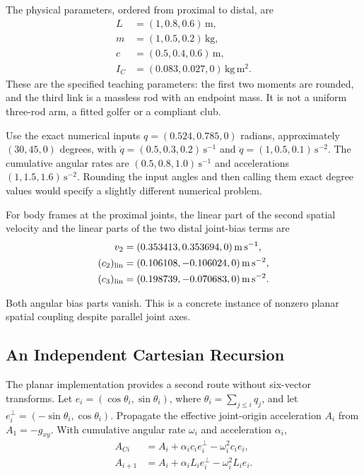 The physical parameters, ordered from proximal to distal, are
\begin{equation}
 \begin{aligned}
 L&=(1,0.8,0.6)\,\mathrm m,\\
 m&=(1,0.5,0.2)\,\mathrm{kg},\\
 c&=(0.5,0.4,0.6)\,\mathrm m,\\
 I_C&=(0.083,0.027,0)\,\mathrm{kg\,m^2}.
 \end{aligned}
 \label{eq:rnea_planar_parameters}
\end{equation}
 These are the specified teaching parameters: the first two moments are rounded, and the third link is a massless rod with an endpoint mass. It is not a uniform three-rod arm, a fitted golfer or a compliant club.

Use the exact numerical inputs $q=(0.524,0.785,0)$ radians, approximately $(30,45,0)$ degrees, with $\dot q=(0.5,0.3,0.2)\,\mathrm{s^{-1}}$ and $\ddot q=(1,0.5,0.1)\,\mathrm{s^{-2}}$. The cumulative angular rates are $(0.5,0.8,1.0)\,\mathrm{s^{-1}}$ and accelerations $(1,1.5,1.6)\,\mathrm{s^{-2}}$. Rounding the input angles and then calling them exact degree values would specify a slightly different numerical problem.

For body frames at the proximal joints, the linear part of the second spatial velocity and the linear parts of the two distal joint-bias terms are
\begin{equation}
 \begin{aligned}
 v_2&=(0.353413,0.353694,0)\,\mathrm{m\,s^{-1}},\\
 (c_2)_{\rm lin}&=(0.106108,-0.106024,0)\,\mathrm{m\,s^{-2}},\\
 (c_3)_{\rm lin}&=(0.198739,-0.070683,0)\,\mathrm{m\,s^{-2}}.
 \end{aligned}
 \label{eq:rnea_distal_bias_values}
\end{equation}

Both angular bias parts vanish. This is a concrete instance of nonzero planar spatial coupling despite parallel joint axes.

\subsection{An Independent Cartesian Recursion}

The planar implementation provides a second route without six-vector transforms. Let $e_i=(\cos\theta_i,\sin\theta_i)$, where $\theta_i=\sum_{j\leq i}q_j$, and let $e_i^\perp=(-\sin\theta_i,\cos\theta_i)$. Propagate the effective joint-origin acceleration $A_i$ from $A_1=-g_{xy}$. With cumulative angular rate $\omega_i$ and acceleration $\alpha_i$,
\begin{equation}
 \begin{aligned}
 A_{Ci}&=A_i+\alpha_i c_i e_i^\perp-\omega_i^2c_i e_i,\\
 A_{i+1}&=A_i+\alpha_i L_i e_i^\perp-\omega_i^2L_i e_i.
 \end{aligned}
 \label{eq:rnea_planar_cartesian}
\end{equation}

